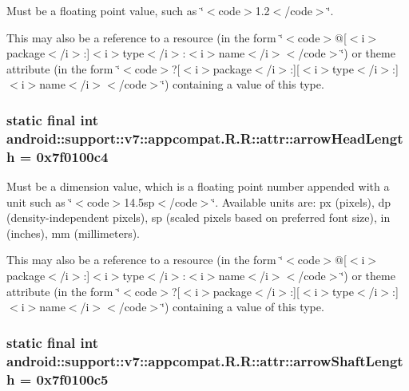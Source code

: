Must be a floating point value, such as \char`\"{}$<$code$>$1.2$<$/code$>$\char`\"{}. 

This may also be a reference to a resource (in the form \char`\"{}$<$code$>$@\mbox{[}$<$i$>$package$<$/i$>$:\mbox{]}$<$i$>$type$<$/i$>$:$<$i$>$name$<$/i$>$$<$/code$>$\char`\"{}) or theme attribute (in the form \char`\"{}$<$code$>$?\mbox{[}$<$i$>$package$<$/i$>$:\mbox{]}\mbox{[}$<$i$>$type$<$/i$>$:\mbox{]}$<$i$>$name$<$/i$>$$<$/code$>$\char`\"{}) containing a value of this type. \hypertarget{classandroid_1_1support_1_1v7_1_1appcompat_1_1_r_1_1attr_4c05c8e7bbe47441a9cbdf93b9f82caa}{
\subsubsection[{arrowHeadLength}]{\setlength{\rightskip}{0pt plus 5cm}static final int android::support::v7::appcompat.R.R::attr::arrowHeadLength = 0x7f0100c4}}
\label{classandroid_1_1support_1_1v7_1_1appcompat_1_1_r_1_1attr_4c05c8e7bbe47441a9cbdf93b9f82caa}


Must be a dimension value, which is a floating point number appended with a unit such as \char`\"{}$<$code$>$14.5sp$<$/code$>$\char`\"{}. Available units are: px (pixels), dp (density-independent pixels), sp (scaled pixels based on preferred font size), in (inches), mm (millimeters). 

This may also be a reference to a resource (in the form \char`\"{}$<$code$>$@\mbox{[}$<$i$>$package$<$/i$>$:\mbox{]}$<$i$>$type$<$/i$>$:$<$i$>$name$<$/i$>$$<$/code$>$\char`\"{}) or theme attribute (in the form \char`\"{}$<$code$>$?\mbox{[}$<$i$>$package$<$/i$>$:\mbox{]}\mbox{[}$<$i$>$type$<$/i$>$:\mbox{]}$<$i$>$name$<$/i$>$$<$/code$>$\char`\"{}) containing a value of this type. \hypertarget{classandroid_1_1support_1_1v7_1_1appcompat_1_1_r_1_1attr_8170a89be888d1b077d051c83a418428}{
\subsubsection[{arrowShaftLength}]{\setlength{\rightskip}{0pt plus 5cm}static final int android::support::v7::appcompat.R.R::attr::arrowShaftLength = 0x7f0100c5}}
\label{classandroid_1_1support_1_1v7_1_1appcompat_1_1_r_1_1attr_8170a89be888d1b077d051c83a418428}


